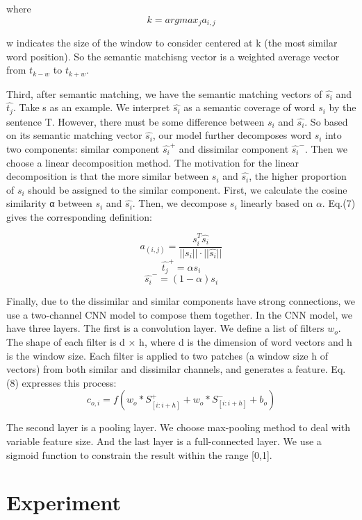 \documentclass[11pt,a4paper]{article}
\begin{document}
where \[k=argmax_{j}a_{i,j}\]

w indicates the size of the window to consider centered at k (the most similar word position). So the semantic matchisng vector is a weighted average vector from $t_{k-w}$ to $t_{k+w}$.

Third, after semantic matching, we have the semantic matching vectors of $\hat{s_{i}}$ and $\hat{t_{j}}$. Take s as an example. We interpret $\hat{s_{i}}$ as a semantic coverage of word $s_{i}$ by the sentence T. However, there must be some difference between $s_{i}$ and $\hat{s_{i}}$. So based on its semantic matching vector $\hat{s_{i}}$, our model further decomposes word $s_{i}$ into two components: similar component $\hat{s_{i}}^{+}$ and dissimilar component $\hat{s_{i}}^{-}$. Then we choose a linear decomposition method. The motivation for the linear decomposition is that the more similar between $s_{i}$ and $\hat{s_{i}}$, the higher proportion of $s_{i}$ should be assigned to the similar component. First, we calculate the cosine similarity α between $s_{i}$ and $\hat{s_{i}}$. Then, we decompose $s_{i}$ linearly based on $\alpha$. Eq.(7) gives the corresponding definition:

\[a_{(i,j)}=\frac{s_{i}^{T}\hat{s_{i}}}{||s_{i}||\cdot||\hat{s_{i}}||} \]  
\[\hat{t_{j}}^{+} = \alpha
s_{i}\]
\begin{equation}
\hat{s_{i}}^{-} = (1-\alpha)s_{i}
\end{equation}

Finally, due to the dissimilar and similar components have strong connections, we use a two-channel CNN model \cite{Kim2014ConvolutionalNN} to compose them together. In the CNN model, we have three layers. The first is a convolution layer. We define a list of filters ${w_{o}}$. The shape of each filter is d × h, where d is the dimension of word vectors and h is the window size. Each filter is applied to two patches (a window size h of vectors) from both similar and dissimilar channels, and generates a feature. Eq.(8) expresses this process:
\begin{equation}
c_{o,i}=f(w_{o}*S_{[i:i+h]}^{+}+w_{o}*S_{[i:i+h]}^{-}+b_{o})
\end{equation}

The second layer is a pooling layer. We choose max-pooling method to deal with variable feature size. And the last layer is a full-connected layer. We use a sigmoid function to constrain the result within the range [0,1].

\section{Experiment}
\end{document}
